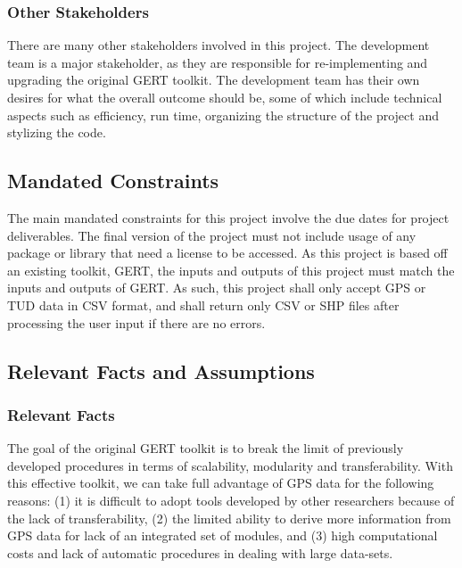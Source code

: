 \documentclass[12pt, titlepage]{article}
\begin{document}
\subsubsection{Other Stakeholders}

There are many other stakeholders involved in this project. The development team is a major stakeholder, as they are responsible for re-implementing and upgrading the original GERT toolkit. The development team has their own desires for what the overall outcome should be, some of which include technical aspects such as efficiency, run time, organizing the structure of the project and  stylizing the code.

\subsection{Mandated Constraints}
The main mandated constraints for this project involve the due dates for project deliverables. The final version of the project must not include usage of any package or library that need a license to be accessed. As this project is based off an existing toolkit, GERT, the inputs and outputs of this project must match the inputs and outputs of GERT. As such, this project shall only accept GPS or TUD data in CSV format, and shall return only CSV or SHP files after processing the user input if there are no errors.

\subsection{Relevant Facts and Assumptions}

\subsubsection{Relevant Facts}
The goal of the original GERT toolkit is to break the limit of previously developed procedures in terms of scalability, modularity and transferability. With this effective toolkit, we can take full advantage of GPS data for the following reasons: (1) it is difficult to adopt tools developed by other researchers because of the lack of transferability, (2) the limited ability to derive more information from GPS data for lack of an integrated set of modules, and (3) high computational costs and lack of automatic procedures in dealing with large data-sets. 
\end{document}
